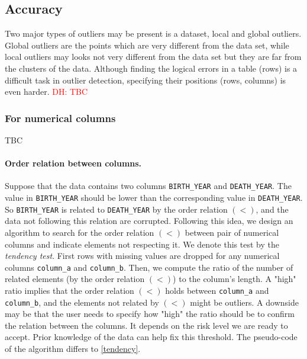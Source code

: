 \documentclass{article}
\newcommand\dhawat[1]{\textcolor{red}{DH: #1}}
\begin{document}
\subsection{Accuracy} %
\label{sub:Accuracy }
Two major types of outliers may be present is a dataset, local and global outliers.
Global outliers are the points which are very different from the data set, while local outliers may looks not very different from the data set but they are far from the clusters of the data.
Although finding the logical errors in a table (rows) is a difficult task in outlier detection, specifying their positions (rows, columns) is even harder.
\dhawat{TBC}
\subsubsection{For numerical columns} %
\label{ssub:For numerical columns}
TBC

\paragraph{Order relation between columns.} %
\label{sub:Logical order relation}
Suppose that the data contains two columns \texttt{BIRTH\_YEAR} and \texttt{DEATH\_YEAR}.
The value in \texttt{BIRTH\_YEAR} should be lower than the corresponding value in \texttt{DEATH\_YEAR}.
So \texttt{BIRTH\_YEAR} is related to \texttt{DEATH\_YEAR} by the order relation $(<)$, and the data not following this relation are corrupted.
Following this idea, we design an algorithm to search for the order relation $(<)$ between pair of numerical columns and indicate elements not respecting it.
We denote this test by the \textit{tendency test}.
First rows with missing values are dropped for any numerical columns \texttt{column\_a} and \texttt{column\_b}.
Then, we compute the ratio of the number of related elements (by the order relation $(<)$) to the column's length.
A "high" ratio implies that the order relation $(<)$ holds between \texttt{column\_a} and \texttt{column\_b}, and the elements not related by $(<)$ might be outliers.
A downside may be that the user needs to specify how "high" the ratio should be to confirm the relation between the columns.
It depends on the risk level we are ready to accept.
Prior knowledge of the data can help fix this threshold.
The pseudo-code of the algorithm differs to \ref{tendency}.
\end{document}
